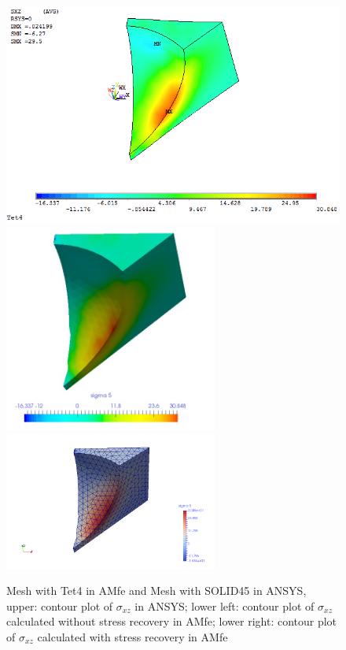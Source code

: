 \begin{figure}[htbp]
	\begin{center}
		\includegraphics[width=13cm,clip]{Tet4Sxz.png} 
		\includegraphics[width=7cm,clip]{Tet4SxzPD.png} 		
		\includegraphics[width=7cm,clip]{Tet4SxzP.png} 		
		\caption{Mesh with Tet4 in AMfe and Mesh with SOLID45 in ANSYS, upper: contour plot of $\sigma_{xz}$ in ANSYS; lower left: contour plot of $\sigma_{xz}$ calculated without stress recovery in AMfe; lower right: contour plot of $\sigma_{xz}$ calculated with stress recovery in AMfe} \label{fig: Tet4_Sxz}
	\end{center}
\end{figure}
\clearpage 

